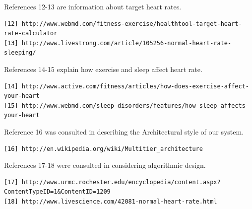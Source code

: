 \documentclass[letterpaper,english, 12pt]{scrreprt}
\begin{document}
References 12-13 are information about target heart rates.
\begin{verbatim}
[12] http://www.webmd.com/fitness-exercise/healthtool-target-heart-rate-calculator
[13] http://www.livestrong.com/article/105256-normal-heart-rate-sleeping/
\end{verbatim}

References 14-15 explain how exercise and sleep affect heart rate.
\begin{verbatim}
[14] http://www.active.com/fitness/articles/how-does-exercise-affect-your-heart
[15] http://www.webmd.com/sleep-disorders/features/how-sleep-affects-your-heart
\end{verbatim}

Reference 16 was consulted in describing the Architectural style of our system.
\begin{verbatim}
[16] http://en.wikipedia.org/wiki/Multitier_architecture
\end{verbatim}

References 17-18 were consulted in considering algorithmic design.
\begin{verbatim}
[17] http://www.urmc.rochester.edu/encyclopedia/content.aspx?ContentTypeID=1&ContentID=1209
[18] http://www.livescience.com/42081-normal-heart-rate.html
\end{verbatim}
\end{document}
